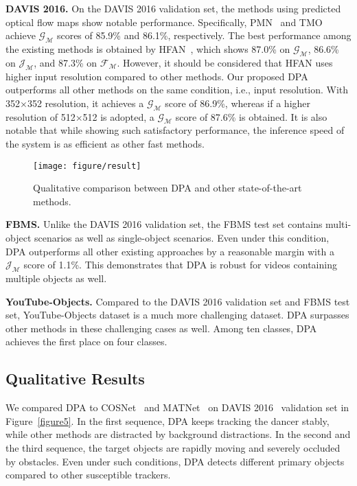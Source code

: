 \documentclass[10pt,twocolumn,letterpaper]{article}
\begin{document}
\vspace{1mm}
\noindent\textbf{DAVIS 2016.} On the DAVIS 2016 validation set, the methods using predicted optical flow maps show notable performance. Specifically, PMN~\cite{PMN} and TMO~\cite{TMO} achieve $\mathcal{G}_\mathcal{M}$ scores of 85.9\% and 86.1\%, respectively. The best performance among the existing methods is obtained by HFAN~\cite{HFAN}, which shows 87.0\% on $\mathcal{G}_\mathcal{M}$, 86.6\% on $\mathcal{J}_\mathcal{M}$, and 87.3\% on $\mathcal{F}_\mathcal{M}$. However, it should be considered that HFAN uses higher input resolution compared to other methods. Our proposed DPA outperforms all other methods on the same condition, i.e., input resolution. With 352$\times$352 resolution, it achieves a $\mathcal{G}_\mathcal{M}$ score of 86.9\%, whereas if a higher resolution of 512$\times$512 is adopted, a $\mathcal{G}_\mathcal{M}$ score of 87.6\% is obtained. It is also notable that while showing such satisfactory performance, the inference speed of the system is as efficient as other fast methods. 

\begin{figure*}[t]
\centering
\texttt{[image: figure/result]}
\caption{Qualitative comparison between DPA and other state-of-the-art methods.}
\label{figure6}
\end{figure*}



\vspace{1mm}
\noindent\textbf{FBMS.} Unlike the DAVIS 2016 validation set, the FBMS test set contains multi-object scenarios as well as single-object scenarios. Even under this condition, DPA outperforms all other existing approaches by a reasonable margin with a $\mathcal{J}_\mathcal{M}$ score of 1.1\%. This demonstrates that DPA is robust for videos containing multiple objects as well.


\vspace{1mm}
\noindent\textbf{YouTube-Objects.} Compared to the DAVIS 2016 validation set and FBMS test set, YouTube-Objects dataset is a much more challenging dataset. DPA surpasses other methods in these challenging cases as well. Among ten classes, DPA achieves the first place on four classes. 



\subsection{Qualitative Results}
\label{quali}
We compared DPA to COSNet~\cite{COSNet} and MATNet~\cite{MATNet} on DAVIS 2016~\cite{DAVIS} validation set in Figure~\ref{figure5}. In the first sequence, DPA keeps tracking the dancer stably, while other methods are distracted by background distractions. In the second and the third sequence, the target objects are rapidly moving and severely occluded by obstacles. Even under such conditions, DPA detects different primary objects compared to other susceptible trackers. 
\end{document}
